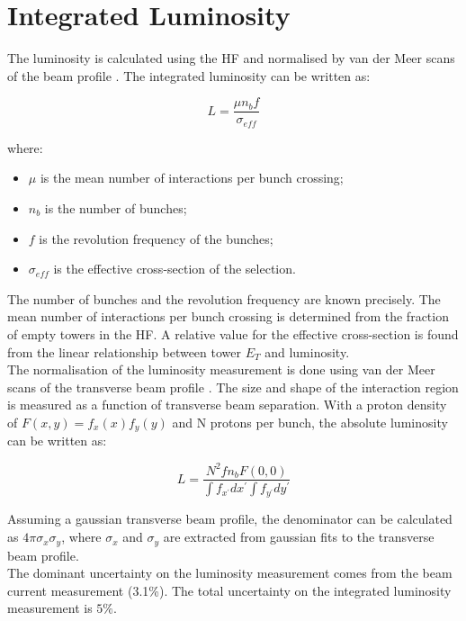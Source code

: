 \section{Integrated Luminosity}

The luminosity is calculated using the HF and normalised by van der Meer scans
of the beam profile \cite{lumi}. The integrated luminosity can be written as:

\begin{equation}
L = \frac{\mu n_{b}f}{\sigma_{eff}}
\label{eq:lumi}
\end{equation}

where:
\begin{itemize}
\item $\mu$ is the mean number of interactions per bunch crossing;
\item $n_{b}$ is the number of bunches;
\item $f$ is the revolution frequency of the bunches;
\item $\sigma_{eff}$ is the effective cross-section of the selection.
\end{itemize}

The number of bunches and the revolution frequency are known precisely. The mean
number of interactions per bunch crossing is determined from the fraction of
empty towers in the HF. A relative value for the effective cross-section is 
found from the linear relationship between tower $E_{T}$ and luminosity. \\

The normalisation of the luminosity measurement is done using van der Meer scans
of the transverse beam profile \cite{vdm_scans}. The size and shape of the
interaction region is measured as a function of transverse beam separation. With
a proton density of $F(x, y) = f_{x}(x)f_{y}(y)$ and N protons per bunch, the 
absolute luminosity can be written as:

\begin{equation}
L = \frac{N^{2}f n_{b}F(0,0)}{\int f_{x^{\prime}}dx^{\prime}\int
f_{y^{\prime}}dy^{\prime}}
\end{equation}

Assuming a gaussian transverse beam profile, the denominator can be 
calculated as $4\pi\sigma_{x}\sigma_{y}$, where $\sigma_{x}$ and $\sigma_{y}$
are extracted from gaussian fits to the transverse beam profile. \\

The dominant uncertainty on the luminosity measurement comes from the beam
current measurement (3.1\unit{\%}). The total uncertainty on the integrated 
luminosity measurement is $5\unit{\%}$.

